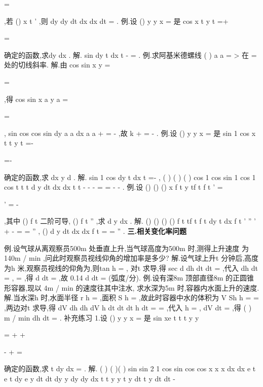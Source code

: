 =

,若
()
x t
'
\neq 
,则
dy
dy
dt
dx
dx
dt
=
. 
\textcolor{lyred}{例}.设
()
y
y x
=
是
cos
x
t
y
t
=+

=

确定的函数,求dy
dx . 
解.
sin
dy
t
dx
t
-
=
. 
\textcolor{lyred}{例}.求阿基米德螺线
(
)
a
a
\rho 
\theta 
=
>
在
\pi 
\theta =
处的切线斜率. 
解.由
cos
sin
x
y
\rho 
\theta 
\rho 
\theta 
=


=

,得
cos
sin
x
a
y
a
\theta 
\theta 
\theta 
\theta 
=


=

,
sin
cos
cos
sin
dy
a
a
dx
a
a
\theta 
\theta 
\theta 
\theta 
\theta 
\theta 
+
=
-
,故
k
\pi 
\pi 
+
=
-
. 
\textcolor{lyred}{例}.设
()
y
y x
=
是
sin
1 cos
x
t
t
y
t
=-


=-

确定的函数,求
dx
y
d
. 
解.
sin
1 cos
dy
t
dx
t
=-
,
(
)
(
)
(
)
cos
1 cos
sin
1 cos
1 cos
t
t
t
d y
dt
dx
dx
t
t
-
-
-
=
\cdots 
=
-
-
. 
\textcolor{lyred}{例}.设
()
()
()
x
f
t
y
tf
t
f t
'
=

'
=
-

,其中
()
f t 二阶可导,
()
f
t
''
\neq 
,求
d y
dx . 
解.
()
()
()
()
f
t
tf
t
f
t
dy
t
dx
f
t
'
''
'
+
-
=
=
''
,
()
d y
dt
dx
dx
f
t
=\cdots 
=
''
. 
\vspace{4pt}
{\bfseries \textcolor{lyred}{三.相关变化率问题}}

\textcolor{lyred}{例}.设气球从离观察员500m 处垂直上升,当气球高度为500m 时,测得上升速度 
为140m / min ,问此时观察员视线仰角的增加率是多少? 
解.设气球上升t 分钟后,高度为h 米,观察员视线的仰角为\alpha ,则tan
h
\alpha =
, 
对t 求导,得
sec
d
dh
dt
dt
\alpha 
\alpha \cdots 
=
\cdots 
,代入
dh
dt =
,
\alpha =
\circ ,得
d
dt
\alpha 
\cdots 
=
\cdots 
,故 
0.14
d
dt
\alpha =
(弧度/分). 
\textcolor{lyred}{例}.设有深8m 顶部直径8m 的正圆锥形容器,现以
4m / min 的速度往其中注水, 
求水深为5m 时,容器内水面上升的速度. 
解.当水深h 时,水面半径
r
h
=
,面积
S
h
\pi 
=
,故此时容器中水的体积为 
V
Sh
h
\pi 
=
=
,两边对t 求导,得
dV
dh
dh
dV
h
dt
dt
dt
h
dt
\pi 
\pi 
=
\cdots 
\cdots 
\Rightarrow 
=
\cdots 
,代入 
h =
,
dV
dt =
,得
(
)
m / min
dh
dt
\pi 
=
. 
\textcolor{lyred}{补充练习 }
1.设
()
y
y x
=
是
sin
xe
t
t
t
y
y
\pi 

=
+
+

-
+
=

确定的函数,求
t
dy
dx
=
. 
解.
(
)
(
)(
)
sin
sin
2 1
cos
sin
cos
cos
x
x
x
dx
dx
e
t
e
t
dy
e
y
dt
dt
dy
y
dy
dy
dx
t
t
y
y
t
y
dt
t
y
dt
dt
-


